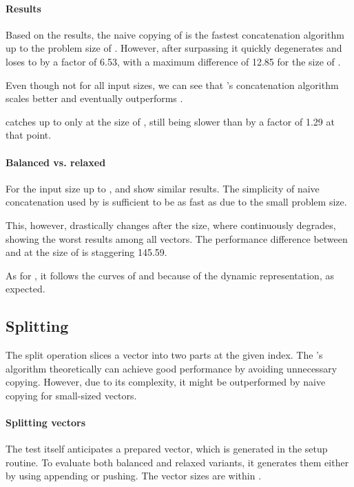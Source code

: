 \paragraph{Results}
Based on the results, the naive copying of \stdvec{} is the fastest concatenation algorithm up to the problem size of . However, after surpassing  it quickly degenerates and loses to \rrbvec{} by a factor of 6.53, with a maximum difference of 12.85 for the size of .

Even though not for all input sizes, we can see that \rrbvec{}'s concatenation algorithm scales better and eventually outperforms \stdvec{}.

\imrsvec{} catches up to \stdvec{} only at the size of , still being slower than \rrbvec{} by a factor of 1.29 at that point.

\paragraph{Balanced vs. relaxed}
For the input size up to , \rbvec{} and \rrbvec{} show similar results. The simplicity of naive concatenation used by \rbvec{} is sufficient to be as fast as \rrbvec{} due to the small problem size.

This, however, drastically changes after the  size, where \rbvec{} continuously degrades, showing the worst results among all vectors. The performance difference between \rbvec{} and \rrbvec{} at the size of  is staggering 145.59.

As for \pvec{}, it follows the curves of \stdvec{} and \rrbvec{} because of the dynamic representation, as expected.

\subsection{Splitting}
The split operation slices a vector into two parts at the given index. The \rrbtree{}'s algorithm theoretically can achieve good performance by avoiding unnecessary copying. However, due to its complexity, it might be outperformed by naive copying for small-sized vectors.

\paragraph{Splitting vectors}
The test itself anticipates a prepared vector, which is generated in the setup routine. To evaluate both balanced and relaxed variants, it generates them either by using appending or pushing. The vector sizes are within \range{[128, \kilo{200}]}.

